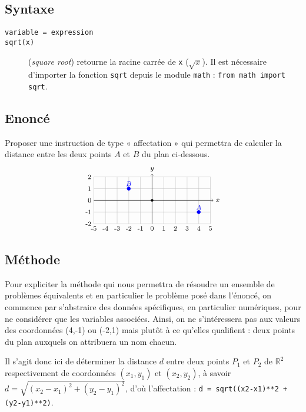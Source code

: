 \subsection{Syntaxe \python}\label{affectation:figures:python}
\begin{description}
\item[\texttt{variable = expression}]\mbox{}
\item[\texttt{sqrt(x)}] (\emph{square root}) retourne la racine carrée de \texttt{x} ($\sqrt{x}$). 
	Il est nécessaire d'importer la fonction \texttt{sqrt} depuis le module \texttt{math} :
	\texttt{from math import sqrt}.
\end{description}

\subsection{Enoncé}\label{affectation:figures:enonce}
Proposer une instruction de type « affectation » qui permettra de calculer 
la distance entre les deux points $A$ et $B$ du plan ci-dessous.
$$
\begin{tikzpicture}[scale=0.5]\footnotesize
\draw[color=lightgray](-5,-2) grid[xstep=1,ystep=1] (5,2);
\foreach \x in {-5,-4,...,5} \draw(\x,-2) node[below]{\x};
\foreach \y in {-2,-1,...,2} \draw(-5,\y) node[left]{\y};
\filldraw(0,0) circle (0.1);
\draw[->] (-5,0) -- (5.25,0);
\draw (5.25,0) node[right]{$x$} ;
\draw[->] (0,-2) -- (0,2.25);
\draw (0,2.25) node[above]{$y$};
\filldraw[color=blue] (4,-1) circle (0.15);
\draw (4,-1) node[above,color=blue]{${A}$};
\filldraw[color=blue] (-2,1) circle (0.15);
\draw (-2,1) node[above,color=blue]{${B}$};
\end{tikzpicture}
$$

\subsection{Méthode}\label{affectation:figures:methode}
Pour expliciter la méthode qui nous permettra de résoudre un ensemble de problèmes 
équivalents et en particulier le problème posé dans l'énoncé, on commence par s'abstraire 
des données spécifiques, en particulier numériques, pour ne considérer que les variables associées. 
Ainsi, on ne s'intéressera pas aux valeurs des coordonnées (4,-1) ou (-2,1) mais
plutôt à ce qu'elles qualifient : deux points du plan auxquels on attribuera un nom chacun.

Il s'agit donc ici de déterminer la distance $d$ entre deux points $P_1$ et $P_2$ de $\mathbb{R}^2$
respectivement de coordonnées $(x_1,y_1)$ et $(x_2,y_2)$, à savoir $\displaystyle d = \sqrt{(x_2-x_1)^2 + (y_2-y_1)^2}$, d'où l'affectation :\linebreak
\texttt{d = sqrt((x2-x1)**2 + (y2-y1)**2)}.


